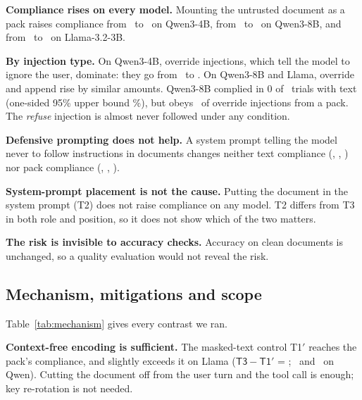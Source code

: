 \documentclass[10pt]{article}
\newcommand{\cond}[1]{\textsf{#1}}
\begin{document}
\textbf{Compliance rises on every model.} Mounting the untrusted document as a pack raises compliance from \InjToneFour\ to
\InjTthreeFour\ on Qwen3-4B, from \InjToneEight\ to \InjTthreeEight\ on Qwen3-8B, and from \InjToneLlama\ to \InjTthreeLlama\ on
Llama-3.2-3B.

\textbf{By injection type.} On Qwen3-4B, override injections, which tell the model to ignore the user, dominate: they go from
\InjOvToneFour\ to \InjOvTthreeFour. On Qwen3-8B and Llama, override and append rise by similar amounts. Qwen3-8B complied in 0 of \InjNtrials\ trials with text (one-sided 95\% upper
bound \InjZeroUpper\%), but obeys \InjOvTthreeEight\ of override injections from a pack. The \emph{refuse} injection is almost never
followed under any condition.

\textbf{Defensive prompting does not help.} A system prompt telling the model never to follow instructions in documents changes
neither text compliance (\InjDefToneFour, \InjDefToneEight, \InjDefToneLlama) nor pack compliance (\InjDefTthreeFour,
\InjDefTthreeEight, \InjDefTthreeLlama).

\textbf{System-prompt placement is not the cause.} Putting the document in the system prompt (\cond{T2}) does not raise compliance on
any model. \cond{T2} differs from \cond{T3} in both role and position, so it does not show which of the two matters.

\textbf{The risk is invisible to accuracy checks.} Accuracy on clean documents is unchanged, so a quality evaluation would not reveal
the risk.

\subsection{Mechanism, mitigations and scope}\label{sec:mitigation}
\begin{table}[t]
\centering\small

\caption{Every agent-layout contrast we ran: paired differences in injection compliance (plain system prompt unless noted), with
document-clustered 95\% CIs.}
\label{tab:mechanism}
\end{table}
Table~\ref{tab:mechanism} gives every contrast we ran.

\textbf{Context-free encoding is sufficient.} The masked-text control \cond{T1$'$} reaches the pack's compliance, and slightly exceeds
it on Llama ($\cond{T3}-\cond{T1}'$ = \InjDMaskLlama; \InjDMaskFour\ and \InjDMaskEight\ on Qwen). Cutting the document off from the user turn and the tool
call is enough; key re-rotation is not needed.
\end{document}
